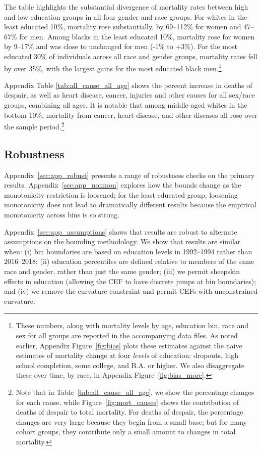 \documentclass[12pt,letterpaper]{article}
\numberwithin{equation}{section}
\begin{document}
The table highlights the substantial divergence of mortality rates
between high and low education groups in all four gender and race
groups. For whites in the least educated 10\%, mortality rose
substantially, by 69--112\% for women and 47--67\% for men. Among
blacks in the least educated 10\%, mortality rose for women by 9--17\%
and was close to unchanged for men (-1\% to +3\%). For the most educated 30\% of
individuals across all race and gender groups, mortality rates fell by
over 35\%, with the largest gains for the most educated black
men.\footnote{These numbers, along with mortality levels by age,
  education bin, race and sex for all groups are reported in the
  accompanying data files. As noted earlier, Appendix
  Figure~\ref{fig:bias} plots these estimates against the naive
  estimates of mortality change at four \textit{levels} of education:
  dropouts, high school completion, some college, and B.A. or
  higher. We also disaggregate these over time, by race, in Appendix
  Figure~\ref{fig:bias_more}.}

Appendix Table \ref{tab:all_cause_all_age} shows the percent increase in deaths of despair, as well as heart disease, cancer, injuries and other causes for all sex/race groups, combining all ages. It is notable that among middle-aged whites in the bottom 10\%, mortality from cancer, heart disease, and other diseases all rose over the sample period.\footnote{Note that in Table~\ref{tab:all_cause_all_age}, we show the percentage changes for each cause, while Figure~\ref{fig:mort_causes} shows the contribution of deaths of despair to total mortality. For deaths of despair, the percentage changes are very large because they begin from a small base; but for many cohort groups, they contribute only a small amount to changes in total mortality.}

\subsection{Robustness}
\label{sec:robust}

Appendix~\ref{sec:app_robust} presents a range of robustness checks on the primary results. Appendix~\ref{sec:app_nonmon} explores how the bounds change as the monotonicity restriction is loosened; for the least educated group, loosening monotonicity does not lead to dramatically different results because the empirical monotonicity across bins is so strong.

Appendix~\ref{sec:app_assumptions} shows that results are robust to
alternate assumptions on the bounding methodology. We show that
results are similar when: (i) bin boundaries are based on education
levels in 1992--1994 rather than 2016--2018; (ii) education
percentiles are defined relative to members of the same race and
gender, rather than just the same gender; (iii) we permit sheepskin effects in education (allowing the CEF to have discrete jumps at bin boundaries); and (iv)
we remove the curvature constraint and permit CEFs with unconstrained
curvature.
\end{document}
